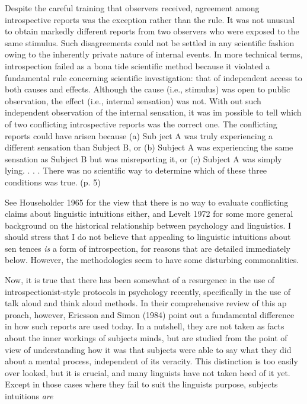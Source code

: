 \begin{styleTextbody}
Despite the careful training that observers received, agreement among introspective reports was the exception rather than the rule. It was not unusual to obtain markedly different reports from two observers who were exposed to the same stimulus. Such disagreements could not be settled in any scientific fashion owing to the inherently private nature of internal events. In more technical terms, introspection failed as a bona tide scientific method because it violated a fundamental rule concerning scientific investigation: that of independent access to both causes and effects. Although the cause (i.e., stimulus) was open to public observation, the effect (i.e., internal sensation) was not. With\- out such independent observation of the internal sensation, it was im\- possible to tell which of two conflicting introspective reports was the correct one. The conflicting reports could have arisen because (a) Sub\- ject A was truly experiencing a different sensation than Subject B, or (b) Subject A was experiencing the same sensation as Subject B but was misreporting it, or (c) Subject A was simply lying. . . . There was no scientific way to determine which of these three conditions was true. (p. 5)
\end{styleTextbody}


\begin{styleTextbody}
See Householder 1965 for the view that there is no way to evaluate conflicting claims about linguistic intuitions either, and Levelt 1972 for some more general background on the historical relationship between psychology and linguistics. I should stress that I do not believe that appealing to linguistic intuitions about sen\- tences \textit{is}\textit{ }a form of introspection, for reasons that are detailed immediately below. However, the methodologies seem to have some disturbing commonalities.
\end{styleTextbody}


\begin{styleTextbody}
Now, it is true that there has been somewhat of a resurgence in the use of introspectionist-style protocols in psychology recently, specifically in the use of {\textquotedbl}talk aloud{\textquotedbl} and {\textquotedbl}think aloud{\textquotedbl} methods. In their comprehensive review of this ap\- proach, however, Ericsson and Simon (1984) point out a fundamental difference in how such reports are used today. In a nutshell, they are not taken as facts about the inner workings of subjects{\textquotesingle} minds, but are studied from the point of view of understanding how it was that subjects were able to say what they did about a mental process, independent of its veracity. This distinction is too easily over\- looked, but it is crucial, and many linguists have not taken heed of it yet. Except in those cases where they fail to suit the linguist{\textquotesingle}s purpose, subjects{\textquotesingle} intuitions \textit{are}
\end{styleTextbody}



